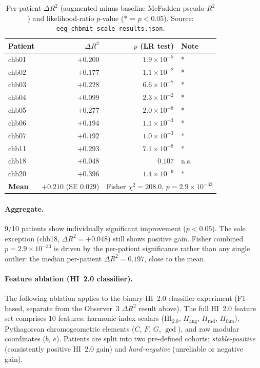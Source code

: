 \documentclass[11pt]{article}
\begin{document}
\begin{table}[h]
\centering
\small
\begin{tabular}{lrrl}
\toprule
\textbf{Patient} & $\Delta R^2$ & $p$ (LR test) & \textbf{Note} \\
\midrule
chb01 & $+0.200$ & $1.9 \times 10^{-5}$ & * \\
chb02 & $+0.177$ & $1.1 \times 10^{-2}$ & * \\
chb03 & $+0.228$ & $6.6 \times 10^{-7}$ & * \\
chb04 & $+0.099$ & $2.3 \times 10^{-2}$ & * \\
chb05 & $+0.277$ & $2.0 \times 10^{-8}$ & * \\
chb06 & $+0.194$ & $1.1 \times 10^{-3}$ & * \\
chb07 & $+0.192$ & $1.0 \times 10^{-3}$ & * \\
chb11 & $+0.293$ & $7.1 \times 10^{-8}$ & * \\
chb18 & $+0.048$ & $0.107$ & n.s. \\
chb20 & $+0.396$ & $1.4 \times 10^{-9}$ & * \\
\midrule
\textbf{Mean} & $\mathbf{+0.210}$ (SE $0.029$) & \multicolumn{2}{l}{Fisher $\chi^2=208.0$, $p=2.9\times10^{-33}$} \\
\bottomrule
\end{tabular}
\caption{Per-patient $\Delta R^2$ (augmented minus baseline McFadden pseudo-$R^2$)
and likelihood-ratio $p$-value ($*$ = $p < 0.05$).
Source: \texttt{eeg\_chbmit\_scale\_results.json}.}
\label{tab:results}
\end{table}

\paragraph{Aggregate.}
9/10 patients show individually significant improvement ($p < 0.05$).
The sole exception (chb18, $\Delta R^2 = +0.048$) still shows positive gain.
Fisher combined $p = 2.9 \times 10^{-33}$ is driven by the per-patient
significance rather than any single outlier: the median per-patient
$\Delta R^2 = 0.197$, close to the mean.

\paragraph{Feature ablation (HI~2.0 classifier).}
The following ablation applies to the binary HI~2.0 classifier experiment
(F1-based, separate from the Observer~3 $\Delta R^2$ result above).
The full HI~2.0 feature set comprises 10 features:
harmonic-index scalars (HI$_{2.0}$, $H_\text{ang}$, $H_\text{rad}$, $H_\text{fam}$),
Pythagorean chromogeometric elements ($C$, $F$, $G$, $\gcd$),
and raw modular coordinates ($b$, $e$).
Patients are split into two pre-defined cohorts:
\emph{stable-positive} (consistently positive HI~2.0 gain) and
\emph{hard-negative} (unreliable or negative gain).
\end{document}
